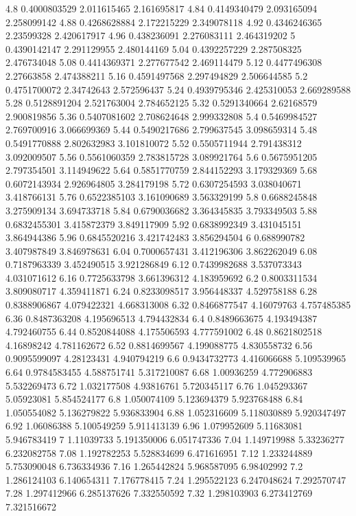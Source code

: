 {4.8 0.4000803529 2.011615465 2.161695817
4.84 0.4149340479 2.093165094 2.258099142
4.88 0.4268628884 2.172215229 2.349078118
4.92 0.4346246365 2.23599328 2.420617917
4.96 0.438236091 2.276083111 2.464319202
5 0.4390142147 2.291129955 2.480144169
5.04 0.4392257229 2.287508325 2.476734048
5.08 0.4414369371 2.277677542 2.469114479
5.12 0.4477496308 2.27663858 2.474388211
5.16 0.4591497568 2.297494829 2.506644585
5.2 0.4751700072 2.34742643 2.572596437
5.24 0.4939795346 2.425310053 2.669289588
5.28 0.5128891204 2.521763004 2.784652125
5.32 0.5291340664 2.62168579 2.900819856
5.36 0.5407081602 2.708624648 2.999332808
5.4 0.5469984527 2.769700916 3.066699369
5.44 0.5490217686 2.799637545 3.098659314
5.48 0.5491770888 2.802632983 3.101810072
5.52 0.5505711944 2.791438312 3.092009507
5.56 0.5561060359 2.783815728 3.089921764
5.6 0.5675951205 2.797354501 3.114949622
5.64 0.5851770759 2.844152293 3.179329369
5.68 0.6072143934 2.926964805 3.284179198
5.72 0.6307254593 3.038040671 3.418766131
5.76 0.6522385103 3.161090689 3.563329199
5.8 0.6688245848 3.275909134 3.694733718
5.84 0.6790036682 3.364345835 3.793349503
5.88 0.6832455301 3.415872379 3.849117909
5.92 0.6838992349 3.431045151 3.864944386
5.96 0.6845520216 3.421742483 3.856294504
6 0.688990782 3.407987849 3.846978631
6.04 0.7000657431 3.412196306 3.862262049
6.08 0.7187963339 3.452490515 3.921286849
6.12 0.7439982688 3.537073343 4.031071612
6.16 0.7725633798 3.661396312 4.183959692
6.2 0.8003311534 3.809080717 4.359411871
6.24 0.8233098517 3.956448337 4.529758188
6.28 0.8388906867 4.079422321 4.668313008
6.32 0.8466877547 4.16079763 4.757485385
6.36 0.8487363208 4.195696513 4.794432834
6.4 0.8489663675 4.193494387 4.792460755
6.44 0.8520844088 4.175506593 4.777591002
6.48 0.8621802518 4.16898242 4.781162672
6.52 0.8814699567 4.199088775 4.830558732
6.56 0.9095599097 4.28123431 4.940794219
6.6 0.9434732773 4.416066688 5.109539965
6.64 0.9784583455 4.588751741 5.317210087
6.68 1.00936259 4.772906883 5.532269473
6.72 1.032177508 4.93816761 5.720345117
6.76 1.045293367 5.05923081 5.854524177
6.8 1.050074109 5.123694379 5.923768488
6.84 1.050554082 5.136279822 5.936833904
6.88 1.052316609 5.118030889 5.920347497
6.92 1.06086388 5.100549259 5.911413139
6.96 1.079952609 5.11683081 5.946783419
7 1.11039733 5.191350006 6.051747336
7.04 1.149719988 5.33236277 6.232082758
7.08 1.192782253 5.528834699 6.471616951
7.12 1.233244889 5.753090048 6.736334936
7.16 1.265442824 5.968587095 6.98402992
7.2 1.286124103 6.140654311 7.176778415
7.24 1.295522123 6.247048624 7.292570747
7.28 1.297412966 6.285137626 7.332550592
7.32 1.298103903 6.273412769 7.321516672
}

